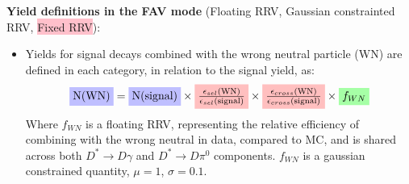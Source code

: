 \documentclass[12pt, landscape]{article}
\begin{document}
\textbf{Yield definitions in the FAV mode} (\colorbox{blue!25}{Floating RRV},
\colorbox{green!35}{Gaussian constrainted RRV}, \colorbox{pink}{Fixed
RRV}):

\begin{itemize}
  \item Yields for signal decays combined with the wrong neutral particle (WN)
  are defined in each category, in relation to the signal yield, as:
  \begin{equation*}
    \colorbox{blue!25}{\text{N(WN)}} = \colorbox{blue!25}{\text{N(signal)}} \times
    \colorbox{pink}{$\frac{\epsilon_{sel}\text{(WN)}}{\epsilon_{sel}\text{(signal)}}$}
    \times \colorbox{pink}{$\frac{\epsilon_{cross}\text{(WN)}}{\epsilon_{cross}\text{(signal)}}$} \times 
    \colorbox{green!35}{$f_{WN}$}
  \end{equation*}
  Where $f_{WN}$ is a floating RRV, representing the relative efficiency of
  combining with the wrong neutral in data, compared to MC, and is shared across
  both $D^*\rightarrow D\gamma$ and $D^*\rightarrow D\pi^0$ components. $f_{WN}$
  is a gaussian constrained quantity, $\mu=1$, $\sigma=0.1$.


\end{itemize}
\end{document}
